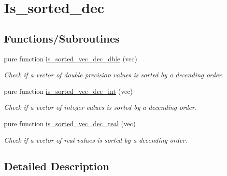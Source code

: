 \hypertarget{group__is__sorted__dec}{\section{Is\-\_\-sorted\-\_\-dec}
\label{group__is__sorted__dec}
}
\subsection*{Functions/\-Subroutines}
\begin{DoxyCompactItemize}
\item 
pure function \hyperlink{group__is__sorted__dec_gaa9e8b65733c813e5ac9874514ebe6a3f_gaa9e8b65733c813e5ac9874514ebe6a3f}{is\-\_\-sorted\-\_\-vec\-\_\-dec\-\_\-dble} (vec)
\begin{DoxyCompactList}\small\item\em Check if a vector of double precision values is sorted by a decending order. \end{DoxyCompactList}\item 
pure function \hyperlink{group__is__sorted__dec_ga00eb7a25d7450d6c786977253b047625_ga00eb7a25d7450d6c786977253b047625}{is\-\_\-sorted\-\_\-vec\-\_\-dec\-\_\-int} (vec)
\begin{DoxyCompactList}\small\item\em Check if a vector of integer values is sorted by a decending order. \end{DoxyCompactList}\item 
pure function \hyperlink{group__is__sorted__dec_gab8a6976d6a2e892be2395b3851d9ba93_gab8a6976d6a2e892be2395b3851d9ba93}{is\-\_\-sorted\-\_\-vec\-\_\-dec\-\_\-real} (vec)
\begin{DoxyCompactList}\small\item\em Check if a vector of real values is sorted by a decending order. \end{DoxyCompactList}\end{DoxyCompactItemize}


\subsection{Detailed Description}


